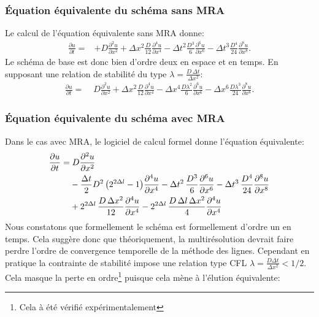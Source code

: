 \subsubsection{Équation équivalente du schéma sans MRA}
    Le calcul de l'équation équivalente sans MRA donne:
    \begin{align}
        \frac{\partial u}{\partial t}  =&+ D \frac{\partial^{2}u}{\partial x^{2}} 
        + \Delta x^{2} \frac{D}{12}             \frac{\partial^{4}u}{\partial x^{4}} 
        -  \Delta t^{2} \frac{D^{3}}{6}          \frac{\partial^{6}u}{\partial x^{6}} 
        -  \Delta t^{3} \frac{D^{4}}{24}        \frac{\partial^{8}u}{\partial x^{8}}.
    \end{align}
    Le schéma de base est donc bien d'ordre deux en espace et en temps.
    En supposant une relation de stabilité du type $\lambda = \frac{D\, \Delta t }{\Delta x^2}$:
    \begin{align}
        \frac{\partial u}{\partial t}  =&\; D \frac{\partial^{2}u}{\partial x^{2}} 
        + \Delta x^{2} \frac{D}{12}             \frac{\partial^{4}u}{\partial x^{4}}
        - \Delta x^{4} \frac{D \lambda^2}{6}     \frac{\partial^{6}u}{\partial x^{6}}
        - \Delta x^{6} \frac{D \lambda^3}{24}    \frac{\partial^{8}u}{\partial x^{8}}.
    \end{align}

\subsubsection{Équation équivalente du schéma avec MRA}
    Dans le cas avec MRA, le logiciel de calcul formel donne l'équation équivalente:
    \begin{align}
        \frac{\partial u}{\partial t} =&\; D \frac{\partial^2 u}{\partial x^2} \\\notag
        &- \frac{\Delta t}{2} D^2\, \bigl( 2^{2\Delta l}- 1 \bigr)          \frac{\partial^4 u}{\partial x^4}
        - \Delta t^2\, \frac{D^3}{6}          \frac{\partial^6 u}{\partial x^6}
        - \Delta t^3\, \frac{D^4}{24}         \frac{\partial^8 u}{\partial x^8} \\\notag
        &+ 2^{2\Delta l}\, \frac{D\, \Delta x^2}{12}    \frac{\partial^4 u}{\partial x^4}
        - 2^{2\Delta l}\, \frac{D\, \Delta l\, \Delta x^2}{4} \frac{\partial^4 u}{\partial x^4}
    \end{align}
    Nous constatons que formellement le schéma est formellement d'ordre un en temps.
    Cela suggère donc que théoriquement, la multirésolution devrait faire perdre l'ordre de convergence temporelle de la méthode des lignes.
    Cependant en pratique la contrainte de stabilité impose une relation type CFL $\lambda = \frac{D \Delta t } {\Delta x^2} < 1/2$.
    Cela masque la perte en ordre\footnote{Cela à été vérifié expérimentalement} puisque cela mène à l’élution équivalente:

